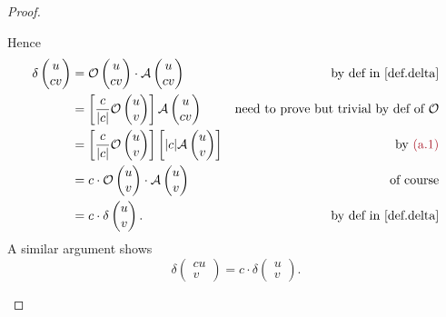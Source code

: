 \begin{proof}
\begin{enumerate}
Hence
\begin{align*}
    \delta \begin{pmatrix}
        u \\ cv
    \end{pmatrix}
    & = \mathcal{O}\begin{pmatrix} u \\ cv \end{pmatrix} \cdot \mathcal{A}\begin{pmatrix} u \\ cv \end{pmatrix} & \text{by def in \ref{def.delta}} \\
    & = \left[\frac{c}{\abs{c}} \mathcal{O}\begin{pmatrix} u \\ v \end{pmatrix}\right] \mathcal{A}\begin{pmatrix} u \\ cv \end{pmatrix} & \text{need to prove but trivial by def of \(\mathcal{O}\)} \\
    & = \left[\frac{c}{\abs{c}} \mathcal{O}\begin{pmatrix} u \\ v \end{pmatrix}\right] \left[\abs{c} \mathcal{A}\begin{pmatrix} u \\ v \end{pmatrix}\right] & \text{by \MAROON{(a.1)}} \\
    & = c \cdot \mathcal{O}\begin{pmatrix} u \\ v \end{pmatrix} \cdot \mathcal{A}\begin{pmatrix} u \\ v \end{pmatrix} & \text{of course} \\
    & = c \cdot \delta \begin{pmatrix}
        u \\ v
    \end{pmatrix}. & \text{by def in \ref{def.delta}}
\end{align*}
A similar argument shows
\[
    \delta \begin{pmatrix}
        cu \\ v
    \end{pmatrix}
    = c \cdot \delta \begin{pmatrix}
        u \\ v
    \end{pmatrix}.
\]


\end{enumerate}
\end{proof}
